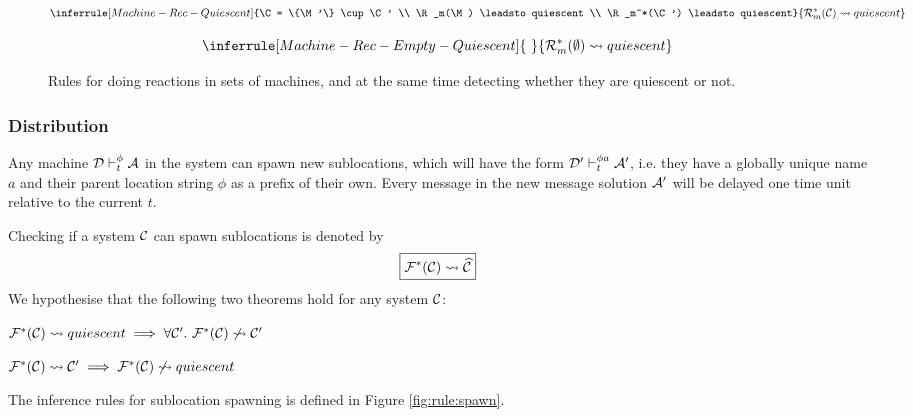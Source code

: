 \begin{figure}[!ht]
{\begin{minipage}{0.97\textwidth}
\begin{equation*}
\inferrule[Machine-Rec-Quiescent]
{\C = \{\M'\} \cup \C'
\\ \R_m(\M) \leadsto quiescent
\\ \R_m^*(\C') \leadsto quiescent}
{\R_m^*(\C) \leadsto quiescent}
\end{equation*}

\begin{equation*}
\inferrule[Machine-Rec-Empty-Quiescent]
{~}
{\R_m^*(\emptyset) \leadsto quiescent}
\end{equation*}

\end{minipage}}
\caption{Rules for doing reactions in sets of machines, and at the same time
detecting whether they are quiescent or not.\label{fig:rule:machine}}
\end{figure}

\newpage

\subsubsection{Distribution}

Any machine $\mathcal{D} \vdash_t^\phi \mathcal{A}$ in the system can spawn new sublocations,
which will have the form $\mathcal{D}' \vdash_t^{\phi a} \mathcal{A}'$, i.e. they have a globally
unique name $a$ and their parent location string $\phi$ as a prefix of their
own. Every message in the new message solution $\mathcal{A}'$ will be delayed one time
unit relative to the current $t$.

Checking if a system $\mathcal{C}$ can spawn sublocations is denoted by
\begin{equation*}
\boxed{\mathcal{F}^*(\mathcal{C}) \leadsto \widehat{\mathcal{C}}}
\end{equation*}
We hypothesise that the following two theorems hold for any system $\mathcal{C}$:
\begin{theorem}
$\mathcal{F}^*(\mathcal{C}) \leadsto quiescent \implies \forall \mathcal{C}'.~ \mathcal{F}^*(\mathcal{C}) \not\leadsto \mathcal{C}'$
\end{theorem}
\begin{theorem}
$\mathcal{F}^*(\mathcal{C}) \leadsto \mathcal{C}' \implies \mathcal{F}^*(\mathcal{C}) \not\leadsto quiescent$
\end{theorem}
The inference rules for sublocation spawning is defined in Figure
\ref{fig:rule:spawn}.

